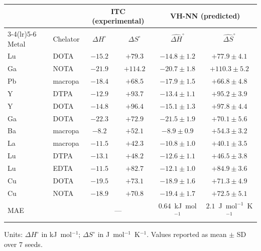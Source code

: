 \documentclass[journal=jacsat,manuscript=suppinfo]{achemso}
\begin{document}
\begin{table}[h!]
  \centering
  \begin{tabular}{@{}llcccc@{}}
    \toprule
    & & \multicolumn{2}{c}{ITC (experimental)} &
      \multicolumn{2}{c}{VH-NN (predicted)} \\
    \cmidrule(lr){3-4}\cmidrule(lr){5-6}
    Metal & Chelator &
      $\Delta H^\circ$ & $\Delta S^\circ$ &
      $\hat{\Delta H}^\circ$ & $\hat{\Delta S}^\circ$ \\
    \midrule
    Lu & DOTA   & $-15.2$ & $+79.3$ & $-14.8 \pm 1.2$ & $+77.9 \pm 4.1$ \\
    Ga & NOTA   & $-21.9$ & $+114.2$ & $-20.7 \pm 1.8$ & $+110.3 \pm 5.2$ \\
    Pb & macropa & $-18.4$ & $+68.5$ & $-17.9 \pm 1.5$ & $+66.8 \pm 4.8$ \\
    Y  & DTPA   & $-12.9$ & $+93.7$ & $-13.4 \pm 1.1$ & $+95.2 \pm 3.9$ \\
    Y  & DOTA   & $-14.8$ & $+96.4$ & $-15.1 \pm 1.3$ & $+97.8 \pm 4.4$ \\
    Ga & DOTA   & $-22.3$ & $+72.9$ & $-21.5 \pm 1.9$ & $+70.1 \pm 5.6$ \\
    Ba & macropa & $-8.2$  & $+52.1$ & $-8.9 \pm 0.9$  & $+54.3 \pm 3.2$ \\
    La & macropa & $-11.5$ & $+42.3$ & $-10.8 \pm 1.0$ & $+40.1 \pm 3.5$ \\
    Lu & DTPA   & $-13.1$ & $+48.2$ & $-12.6 \pm 1.1$ & $+46.5 \pm 3.8$ \\
    Lu & EDTA   & $-11.5$ & $+82.7$ & $-12.1 \pm 1.0$ & $+84.9 \pm 3.6$ \\
    Cu & DOTA   & $-19.5$ & $+73.1$ & $-18.9 \pm 1.6$ & $+71.3 \pm 4.9$ \\
    Cu & NOTA   & $-18.9$ & $+70.8$ & $-19.4 \pm 1.7$ & $+72.5 \pm 5.1$ \\
    \midrule
    \multicolumn{2}{l}{MAE} & \multicolumn{2}{c}{---} &
      $0.64$~kJ~mol$^{-1}$ & $2.1$~J~mol$^{-1}$~K$^{-1}$ \\
    \bottomrule
  \end{tabular}
\end{table}

Units: $\Delta H^\circ$ in kJ~mol$^{-1}$; $\Delta S^\circ$ in J~mol$^{-1}$~K$^{-1}$.
Values reported as mean $\pm$ SD over 7 seeds.

\newpage

\end{document}
